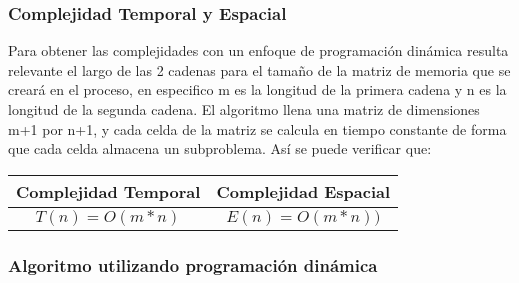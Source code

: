 \subsubsection{Complejidad Temporal y Espacial}

Para obtener las complejidades con un enfoque de programación dinámica resulta relevante el largo de las 2 cadenas para el tamaño de la matriz de memoria que se creará en el proceso, en especifico m es la longitud de la primera cadena y 
n es la longitud de la segunda cadena. El algoritmo llena una matriz de dimensiones m+1 por n+1, y cada celda de la matriz se calcula en tiempo constante de forma que cada celda almacena un subproblema. Así se puede verificar que:

\begin{center}
\begin{tabular}{c|c}
\textbf{Complejidad Temporal} & \textbf{Complejidad Espacial} \\ \hline
$T(n) = O(m * n)$ & $E(n) = O(m *n))$
\end{tabular}
\end{center}

\subsubsection{Algoritmo utilizando programación dinámica}


